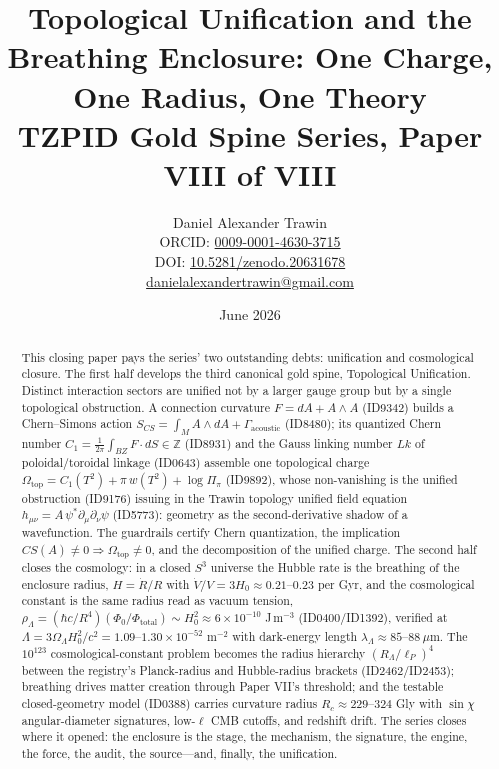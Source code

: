 \documentclass[11pt]{article}
\title{Topological Unification and the Breathing Enclosure: One Charge, One Radius, One Theory\\[0.6em]
\large TZPID Gold Spine Series, Paper VIII of VIII}
\author{Daniel Alexander Trawin\\
\small ORCID: \href{https://orcid.org/0009-0001-4630-3715}{0009-0001-4630-3715}\\
\small DOI: \href{https://doi.org/10.5281/zenodo.20631678}{10.5281/zenodo.20631678}\\
\small \href{mailto:danielalexandertrawin@gmail.com}{danielalexandertrawin@gmail.com}}
\date{June 2026}
\theoremstyle{remark}
\begin{document}
\maketitle

\begin{abstract}
This closing paper pays the series' two outstanding debts: unification and cosmological closure. The first half develops the third canonical gold spine, Topological Unification. Distinct interaction sectors are unified not by a larger gauge group but by a single topological obstruction. A connection curvature $F = dA + A \wedge A$ (ID9342) builds a Chern--Simons action $S_{CS} = \int_M A \wedge dA + \Gamma_{\mathrm{acoustic}}$ (ID8480); its quantized Chern number $C_1 = \frac{1}{2\pi}\int_{BZ} F \cdot dS \in \mathbb{Z}$ (ID8931) and the Gauss linking number $Lk$ of poloidal/toroidal linkage (ID0643) assemble one topological charge $\Omega_{\mathrm{top}} = C_1(T^2) + \pi\, w(T^2) + \log \Pi_\pi$ (ID9892), whose non-vanishing is the unified obstruction (ID9176) issuing in the Trawin topology unified field equation $h_{\mu\nu} = A\, \psi^* \partial_\mu \partial_\nu \psi$ (ID5773): geometry as the second-derivative shadow of a wavefunction. The guardrails certify Chern quantization, the implication $CS(A) \neq 0 \Rightarrow \Omega_{\mathrm{top}} \neq 0$, and the decomposition of the unified charge. The second half closes the cosmology: in a closed $S^3$ universe the Hubble rate is the breathing of the enclosure radius, $H = \dot{R}/R$ with $\dot{V}/V = 3H_0 \approx 0.21$--$0.23$ per Gyr, and the cosmological constant is the same radius read as vacuum tension, $\rho_\Lambda = (\hbar c/R^4)(\Phi_0/\Phi_{\mathrm{total}}) \sim H_0^2 \approx 6 \times 10^{-10}$ J\,m$^{-3}$ (ID0400/ID1392), verified at $\Lambda = 3\Omega_\Lambda H_0^2/c^2 = 1.09$--$1.30 \times 10^{-52}$ m$^{-2}$ with dark-energy length $\lambda_\Lambda \approx 85$--$88\ \mu$m. The $10^{123}$ cosmological-constant problem becomes the radius hierarchy $(R_\Lambda/\ell_P)^4$ between the registry's Planck-radius and Hubble-radius brackets (ID2462/ID2453); breathing drives matter creation through Paper VII's threshold; and the testable closed-geometry model (ID0388) carries curvature radius $R_c \approx 229$--$324$ Gly with $\sin\chi$ angular-diameter signatures, low-$\ell$ CMB cutoffs, and redshift drift. The series closes where it opened: the enclosure is the stage, the mechanism, the signature, the engine, the force, the audit, the source---and, finally, the unification.
\end{abstract}
\end{document}
